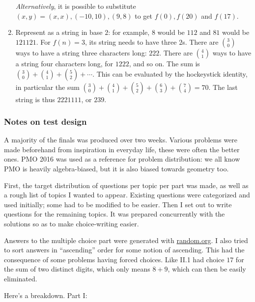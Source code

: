 \documentclass[10pt,paper=letter]{scrartcl}
\begin{document}
\begin{enumerate}
  \emph{Alternatively}, it is possible to substitute $(x, y) = (x, x), (-10, 10), (9, 8)$ to get $f(0), f(20)$ and $f(17)$.
  \item Represent as a string in base $2$: for example, $8$ would be $112$ and $81$ would be $121121$. For $f(n) = 3$, its string needs to have three $2$s. There are $\binom{3}{0}$ ways to have a string three characters long: $222$. There are $\binom{4}{1}$ ways to have a string four characters long, for $1222$, and so on. The sum is $\binom30 + \binom41 + \binom52 + \cdots$. This can be evaluated by the hockeystick identity, in particular the sum $\binom30 + \binom41 + \binom52 + \binom63 + \binom74 = 70$. The last string is thus $2221111$, or $239$.
\end{enumerate}

\newpage

\subsubsection*{Notes on test design}

A majority of the finals was produced over two weeks. Various problems were made beforehand from inspiration in everyday life, these were often the better ones. PMO 2016 was used as a reference for problem distribution: we all know PMO is heavily algebra-biased, but it is also biased towards geometry too. 

First, the target distribution of questions per topic per part was made, as well as a rough list of topics I wanted to appear. Existing questions were categorized and used initially; some had to be modified to be easier. Then I set out to write questions for the remaining topics. It was prepared concurrently with the solutions so as to make choice-writing easier.

Answers to the multiple choice part were generated with \url{random.org}. I also tried to sort answers in ``ascending'' order for some notion of ascending. This had the consequence of some problems having forced choices. Like II.1 had choice $17$ for the sum of two distinct digits, which only means $8+9$, which can then be easily eliminated.

Here's a breakdown. Part I:
\end{document}
